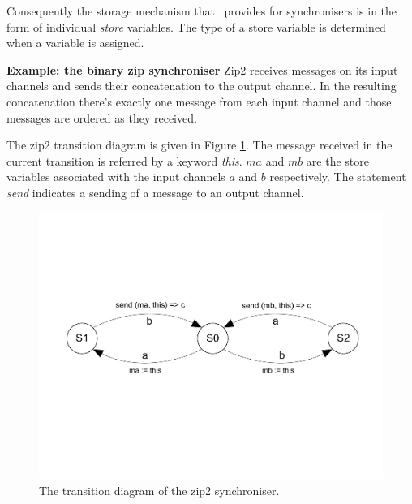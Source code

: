 \begin{enumerate}
Consequently the storage mechanism that \ak\ provides for synchronisers is in the form of individual \emph{store} variables. The type of a store variable is determined when a variable is assigned.

\textbf{Example: the binary zip synchroniser}  Zip2 receives messages on its input channels and sends their concatenation to the output channel. In the resulting concatenation there's exactly one message from each input channel and those messages are ordered as they received.

The zip2 transition diagram is given in Figure \ref{fig:zip2}. The message received in the current transition is referred by a keyword \emph{this}. $ma$ and $mb$ are the store variables associated with the input channels $a$ and $b$ respectively. The statement \emph{send} indicates a sending of a message to an output channel.

  \begin{figure}[here]
  \centering
  \includegraphics[scale=0.4]{figs/zip2.pdf}
  \caption{The transition diagram of the zip2 synchroniser.}
  \label{fig:zip2}
  \end{figure}


\end{enumerate}
